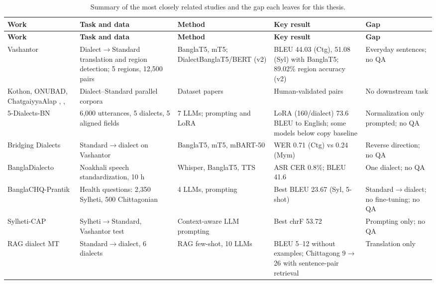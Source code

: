 {\small\setlength{\tabcolsep}{4pt}
\begin{longtable}{@{}H{0.135\textwidth}H{0.195\textwidth}H{0.165\textwidth}H{0.195\textwidth}H{0.170\textwidth}@{}}
\caption{Summary of the most closely related studies and the gap each leaves for this thesis.}\label{tab:related-studies}\\
\toprule
\textbf{Work} & \textbf{Task and data} & \textbf{Method} & \textbf{Key result} & \textbf{Gap} \\
\midrule
\endfirsthead
\toprule
\textbf{Work} & \textbf{Task and data} & \textbf{Method} & \textbf{Key result} & \textbf{Gap} \\
\midrule
\endhead
\bottomrule
\endfoot
Vashantor \cite{faria2023vashantor} & Dialect\ensuremath{\rightarrow}\allowbreak{}Standard translation and region detection; 5 regions, 12,500 pairs & BanglaT5, mT5; DialectBanglaT5/\allowbreak{}BERT (v2) & BLEU 44.03 (Ctg), 51.08 (Syl) with BanglaT5; 89.02\% region accuracy (v2) & Everyday sentences; no QA \\
Kothon, ONUBAD, ChatgaiyyaAlap \cite{kothon2026}, \cite{sultana2025onubad}, \cite{chatgaiyyaalap2025} & Dialect--Standard parallel corpora & Dataset papers & Human-validated pairs & No downstream task \\
5-Dialects-BN \cite{jawad2026fivedialects} & 6,000 utterances, 5 dialects, 5 aligned fields & 7 LLMs; prompting and LoRA & LoRA (160/\allowbreak{}dialect) 73.6 BLEU to English; some models below copy baseline & Normalization only prompted; no QA \\
Bridging Dialects \cite{khandaker2024bridging} & Standard\ensuremath{\rightarrow}\allowbreak{}dialect on Vashantor & BanglaT5, mT5, mBART-50 & WER 0.71 (Ctg) vs 0.24 (Mym) & Reverse direction; no QA \\
BanglaDialecto \cite{samin2024bangladialecto} & Noakhali speech standardization, 10 h & Whisper, BanglaT5, TTS & ASR CER 0.8\%; BLEU 41.6 & One dialect; no QA \\
Bangla\allowbreak{}CHQ-Prantik \cite{prantik2025} & Health questions: 2,350 Sylheti, 500 Chittagonian & 4 LLMs, prompting & Best BLEU 23.67 (Syl, 5-shot) & Standard\ensuremath{\rightarrow}\allowbreak{}dialect; no fine-tuning; no QA \\
Sylheti-CAP \cite{prama2025sylheticap} & Sylheti\ensuremath{\rightarrow}\allowbreak{}Standard, Vashantor test & Context-aware LLM prompting & Best chrF 53.72 & Prompting only; no QA \\
RAG dialect MT \cite{sami2025comparative} & Standard\ensuremath{\rightarrow}\allowbreak{}dialect, 6 dialects & RAG few-shot, 10 LLMs & BLEU 5--12 without examples; Chittagong 9\ensuremath{\rightarrow}\allowbreak{}26 with sentence-pair retrieval & Translation only \\

\end{longtable}}
